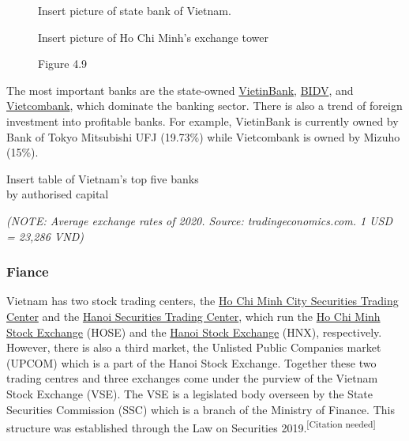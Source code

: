 \documentclass[openany]{book}
\begin{document}
\begin{figure}
    \begin{framed}
    Insert picture of state bank of Vietnam.
    \caption*{State Bank of Vietnam in Ho Chi Minh City (Saigon)}
    \caption*{Figure 4.8}
    \end{framed}
    
    \begin{framed}
    Insert picture of Ho Chi Minh's exchange tower
    \caption*{Ho Chi Minh City Stock Exchange}
    \caption*{Figure 4.9}
    \end{framed}
    \vspace{-50pt}
\end{figure}
The most important banks are the state-owned \href{https://en.wikipedia.org/wiki/Vietinbank}{VietinBank}, \href{https://en.wikipedia.org/wiki/BIDV}{BIDV}, and \href{https://en.wikipedia.org/wiki/Vietcombank}{Vietcombank}, which dominate the banking sector. There is also a trend of foreign investment into profitable banks. For example, VietinBank is currently owned by Bank of Tokyo Mitsubishi UFJ (19.73\%) while Vietcombank is owned by Mizuho (15\%).

\begin{table}[h]
    Insert table of Vietnam's top five banks\\by authorised capital
\end{table}
\textit{(NOTE: Average exchange rates of 2020. Source: tradingeconomics.com. 1 USD = 23,286 VND)}

\subsubsection{Fiance}
Vietnam has two stock trading centers, the \href{https://en.wikipedia.org/wiki/Ho_Chi_Minh_City_Securities_Trading_Center}{Ho Chi Minh City Securities Trading Center} and the \href{https://en.wikipedia.org/wiki/Hanoi_Securities_Trading_Center}{Hanoi Securities Trading Center}, which run the \href{https://en.wikipedia.org/wiki/Ho_Chi_Minh_Stock_Exchange}{Ho Chi Minh Stock Exchange} (HOSE) and the \href{https://en.wikipedia.org/wiki/Hanoi_Stock_Exchange}{Hanoi Stock Exchange} (HNX), respectively. However, there is also a third market, the Unlisted Public Companies market (UPCOM) which is a part of the Hanoi Stock Exchange. Together these two trading centres and three exchanges come under the purview of the Vietnam Stock Exchange (VSE). The VSE is a legislated body overseen by the State Securities Commission (SSC) which is a branch of the Ministry of Finance. This structure was established through the Law on Securities 2019.\textsuperscript{[Citation needed]}
\end{document}
